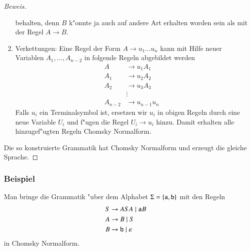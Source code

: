\begin{proof}[Beweis]
\begin{enumerate}
behalten, denn $B$ k"onnte ja auch auf andere Art erhalten worden
sein als mit der Regel $A\to B$.
\item Verkettungen: Eine Regel der Form $A\to u_1\dots u_n$ kann mit
Hilfe neuer Variablen $A_1,\dots,A_{n-2}$ in folgende Regeln abgebildet
werden
\begin{align*}
A&\to u_1A_1\\
A_1&\to u_2A_2\\
A_2&\to u_3A_3\\
&\vdots\\
A_{n-2}&\to u_{n-1}u_n
\end{align*}
Falls $u_i$ ein Terminalsymbol ist, ersetzen wir $u_i$ in obigen
Regeln durch eine neue Variable $U_i$ und f"ugen die Regel
$U_i\to u_i$ hinzu. Damit erhalten alle hinzugef"ugten Regeln
Chomsky Normalform.
\end{enumerate}
Die so konstruierte Grammatik hat Chomsky Normalform und erzeugt die
gleiche Sprache.
\end{proof}

\subsubsection{Beispiel}
Man bringe die Grammatik "uber dem Alphabet $\Sigma=\{{\tt a},{\tt b}\}$
mit den Regeln
\begin{align*}
S&\to ASA\;|\; {\tt a}B\\
A&\to B\;|\; S\\
B&\to{\tt b}\;|\; \varepsilon
\end{align*}
in Chomsky Normalform.

